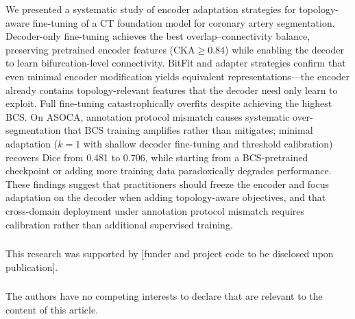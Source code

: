 \documentclass[runningheads]{llncs}
\begin{document}
We presented a systematic study of encoder adaptation strategies for topology-aware fine-tuning of a CT foundation model for coronary artery segmentation.
Decoder-only fine-tuning achieves the best overlap--connectivity balance, preserving pretrained encoder features (CKA${\geq}0.84$) while enabling the decoder to learn bifurcation-level connectivity.
BitFit and adapter strategies confirm that even minimal encoder modification yields equivalent representations---the encoder already contains topology-relevant features that the decoder need only learn to exploit.
Full fine-tuning catastrophically overfits despite achieving the highest BCS.
On ASOCA, annotation protocol mismatch causes systematic over-segmentation that BCS training amplifies rather than mitigates; minimal adaptation ($k{=}1$ with shallow decoder fine-tuning and threshold calibration) recovers Dice from 0.481 to 0.706, while starting from a BCS-pretrained checkpoint or adding more training data paradoxically degrades performance.
These findings suggest that practitioners should freeze the encoder and focus adaptation on the decoder when adding topology-aware objectives, and that cross-domain deployment under annotation protocol mismatch requires calibration rather than additional supervised training.

\begin{credits}
\subsubsection{\ackname}
This research was supported by [funder and project code to be disclosed upon publication].

\subsubsection{\discintname}
The authors have no competing interests to declare that are relevant to the content of this article.
\end{credits}



\end{document}
